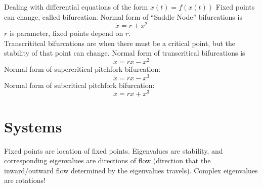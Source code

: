 \documentclass{article}
\date{Winter Semester 2022}
\author{\EC}
\begin{document}
\maketitle
Dealing with differential equations of the form $\dot{x}(t)=f(x(t))$
Fixed points can change, called bifurcation. Normal form of ``Saddle Node'' bifurcations is $$\dot{x}=r+x^2$$
$r$ is parameter, fixed points depend on $r$.
\\
Transcrititcal bifurcations are when there must be a critical point, but the stability of that point can change. Normal form of transcritical bifurcations is 
$$\dot{x}=rx-x^2$$
Normal form of supercritical pitchfork bifurcation: 
$$\dot{x}=rx-x^3$$
Normal form of subcritical pitchfork bifurcation:
$$\dot{x}=rx+x^3$$
\section{Systems}
Fixed points are location of fixed points. Eigenvalues are stability, and corresponding eigenvalues are directions of flow (direction that the inward/outward flow determined by the eigenvalues travels). Complex eigenvalues are rotations! 
\end{document}
